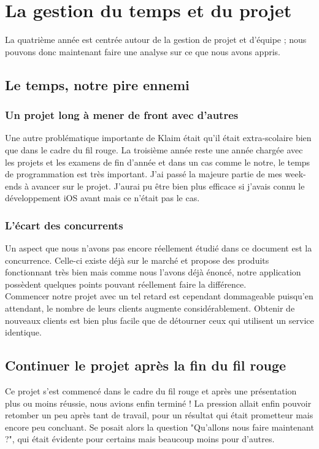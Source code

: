 \documentclass{article}
\begin{document}
\section{La gestion du temps et du projet}
		La quatrième année est centrée autour de la gestion de projet et d'équipe ; nous pouvons donc maintenant faire une analyse sur ce que nous avons appris.
		
	\subsection{Le temps, notre pire ennemi}
		\subsubsection{Un projet long à mener de front avec d'autres}
		Une autre problématique importante de Klaim était qu'il était extra-scolaire bien que dans le cadre du fil rouge. La troisième année reste une année chargée avec les projets et les examens de fin d'année et dans un cas comme le notre, le temps de programmation est très important. J'ai passé la majeure partie de mes week-ends à avancer sur le projet. J'aurai pu être bien plus efficace si j'avais connu le développement iOS avant mais ce n'était pas le cas.

		\subsubsection{L'écart des concurrents}
		Un aspect que nous n'avons pas encore réellement étudié dans ce document est la concurrence. Celle-ci existe déjà sur le marché et propose des produits fonctionnant très bien mais comme nous l'avons déjà énoncé, notre application possèdent quelques points pouvant réellement faire la différence.\\
		
		Commencer notre projet avec un tel retard est cependant dommageable puisqu'en attendant, le nombre de leurs clients augmente considérablement. Obtenir de nouveaux clients est bien plus facile que de détourner ceux qui utilisent un service identique.
		
	\subsection{Continuer le projet après la fin du fil rouge}
	Ce projet s'est commencé dans le cadre du fil rouge et après une présentation plus ou moins réussie, nous avions enfin terminé ! La pression allait enfin pouvoir retomber un peu après tant de travail, pour un résultat qui était prometteur mais encore peu concluant. Se posait alors la question "Qu'allons nous faire maintenant ?", qui était évidente pour certains mais beaucoup moins pour d'autres.
\end{document}
